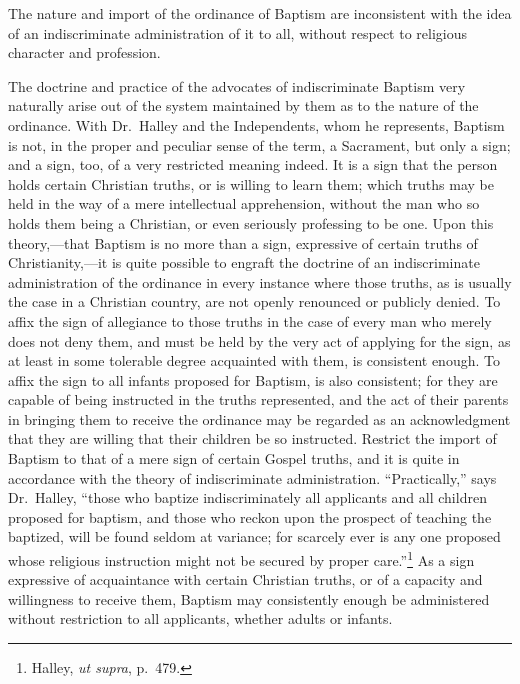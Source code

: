 \documentclass[
]{book}
\begin{document}
The nature and import of the ordinance of Baptism are inconsistent with the idea of an indiscriminate administration of it to all, without respect to religious character and profession.

The doctrine and practice of the advocates of indiscriminate Baptism very naturally arise out of the system maintained by them as to the nature of the ordinance. With Dr.~Halley and the Independents, whom he represents, Baptism is not, in the proper and peculiar sense of the term, a Sacrament, but only a sign; and a sign, too, of a very restricted meaning indeed. It is a sign that the person holds certain Christian truths, or is willing to learn them; which truths may be held in the way of a mere intellectual apprehension, without the man who so holds them being a Christian, or even seriously professing to be one. Upon this theory,---that Baptism is no more than a sign, expressive of certain truths of Christianity,---it is quite possible to engraft the doctrine of an indiscriminate administration of the ordinance in every instance where those truths, as is usually the case in a Christian country, are not openly renounced or publicly denied. To affix the sign of allegiance to those truths in the case of every man who merely does not deny them, and must be held by the very act of applying for the sign, as at least in some tolerable degree acquainted with them, is consistent enough. To affix the sign to all infants proposed for Baptism, is also consistent; for they are capable of being instructed in the truths represented, and the act of their parents in bringing them to receive the ordinance may be regarded as an acknowledgment that they are willing that their children be so instructed. Restrict the import of Baptism to that of a mere sign of certain Gospel truths, and it is quite in accordance with the theory of indiscriminate administration. ``Practically,'' says Dr.~Halley, ``those who baptize indiscriminately all applicants and all children proposed for baptism, and those who reckon upon the prospect of teaching the baptized, will be found seldom at variance; for scarcely ever is any one proposed whose religious instruction might not be secured by proper care.''\footnote{Halley, \emph{ut supra}, p.~479.} As a sign expressive of acquaintance with certain Christian truths, or of a capacity and willingness to receive them, Baptism may consistently enough be administered without restriction to all applicants, whether adults or infants.
\end{document}
